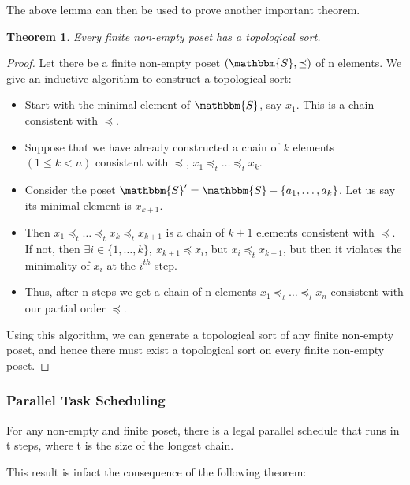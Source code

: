 \documentclass[14pt]{extarticle}
\newcommand{\Sset}{\mathbbm{S}}
\newcommand{\pordereq}{\preceq}
\newtheorem{theorem}{Theorem}
\begin{document}
The above lemma can then be used to prove another important theorem.

\begin{theorem}
    Every finite non-empty poset has a topological sort.
\end{theorem}

\begin{proof}
    Let there be a finite non-empty poset $(\Sset, \pordereq)$ of n elements. We give an inductive algorithm to construct a topological sort:
    \begin{itemize}
        \item Start with the minimal element of $\Sset$, say $x_1$. This is a chain consistent with $\pordereq$.

        \item Suppose that we have already constructed a chain of $k$ elements $(1 \leq k < n)$ consistent with $\pordereq$, $x_1 \pordereq_t \dots \pordereq_t x_k$.

        \item Consider the poset $\Sset' = \Sset - \{a_1, \dots, a_k \}$. Let us say its minimal element is $x_{k+1}$.

        \item Then $x_1 \pordereq_t \dots \pordereq_t x_k \pordereq_t x_{k+1}$ is a chain of $k+1$ elements consistent with $\pordereq$. If not, then $\exists i \in \{1, \dots, k\}, \ x_{k+1} \pordereq x_i$, but $x_i \pordereq_t x_{k+1}$, but then it violates the minimality of $x_i$ at the $i^{th}$ step.

        \item Thus, after n steps we get a chain of n elements $x_1 \pordereq_t \dots \pordereq_t x_n$ consistent with our partial order $\pordereq$.
    \end{itemize}

    Using this algorithm, we can generate a topological sort of any finite non-empty poset, and hence there must exist a topological sort on every finite non-empty poset.
\end{proof}

\subsubsection{Parallel Task Scheduling}

For any non-empty and finite poset, there is a legal parallel schedule that runs in t steps, where t is the size of the longest chain.

This result is infact the consequence of the following theorem:
\end{document}
